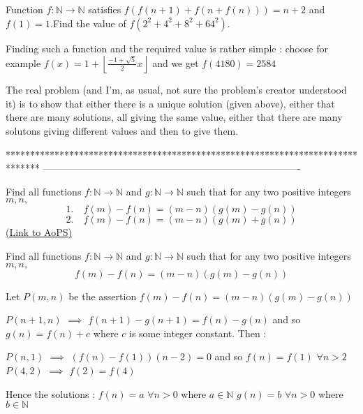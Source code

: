 \begin{solution}
	\begin{tcolorbox}Function  $f: \mathbb{N}\to\mathbb{N}$  satisfies  $f(f(n+1)+f(n+f(n)))=n+2$ and $f(1)=1$.Find the value of $f(2^2+4^2+8^2+64^2)$.\end{tcolorbox}
Finding such a function and the required value is rather simple : choose for example $f(x)=1+\left\lfloor\frac{-1+\sqrt 5}2x\right\rfloor$ and we get $\boxed{f(4180)=2584}$

The real problem (and I'm, as usual, not sure the problem's creator understood it) is to show that either there is a unique solution (given above), either that there are many solutions, all giving the same value, either that there are many solutons giving different values and then to give them.
\end{solution}
*******************************************************************************
-------------------------------------------------------------------------------

\begin{problem}
	Find all functions $f:\mathbb N\to \mathbb N$ and $g:\mathbb N\to \mathbb N$ such that for any two positive integers $m,n,$ \[1.\quad f(m)-f(n)=(m-n)(g(m)-g(n))\]
\[2.\quad f(m)-f(n)=(m-n)(g(m)+g(n))\]
	\flushright \href{https://artofproblemsolving.com/community/c6h528722}{(Link to AoPS)}
\end{problem}



\begin{solution}
	\begin{tcolorbox}Find all functions $f:\mathbb N\to \mathbb N$ and $g:\mathbb N\to \mathbb N$ such that for any two positive integers $m,n,$ \[f(m)-f(n)=(m-n)(g(m)-g(n))\]\end{tcolorbox}
Let $P(m,n)$ be the assertion $f(m)-f(n)=(m-n)(g(m)-g(n))$

$P(n+1,n)$ $\implies$ $f(n+1)-g(n+1)=f(n)-g(n)$ and so $g(n)=f(n)+c$ where $c$ is some integer constant. Then :

$P(n,1)$ $\implies$ $(f(n)-f(1))(n-2)=0$ and so $f(n)=f(1)$ $\forall n>2$
$P(4,2)$ $\implies$ $f(2)=f(4)$

Hence the solutions :
$f(n)=a$ $\forall n>0$ where $a\in\mathbb N$
$g(n)=b$ $\forall n>0$ where $b\in\mathbb N$
\end{solution}



